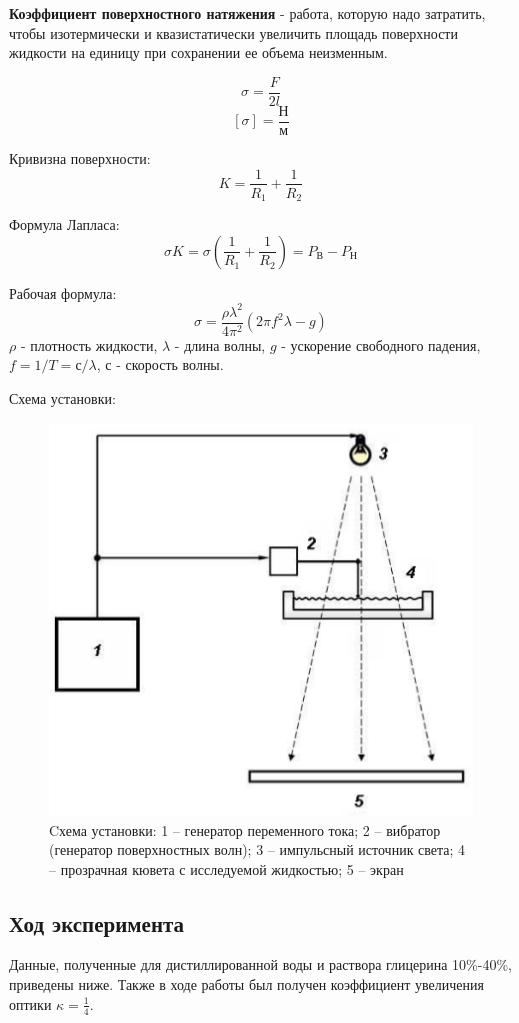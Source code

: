 \documentclass[a4paper,14pt]{article}
\begin{document}
\textbf{Коэффициент поверхностного натяжения} - работа, которую надо затратить, чтобы изотермически и  квазистатически увеличить площадь поверхности жидкости
на единицу при сохранении ее объема неизменным.

$$
\sigma= \frac{F}{2l}
$$
$$
[\sigma] = \frac{Н}{м}
$$

Кривизна поверхности:
$$
K = \frac{1}{R_1} + \frac{1}{R_2}
$$

Формула Лапласа:
$$
\sigma K = \sigma \left(\frac{1}{R_1} + \frac{1}{R_2}\right) = P_В - P_Н
$$

Рабочая формула:
$$
\sigma = \frac{\rho\lambda^2}{4\pi^2}(2\pi f^2\lambda-g)
$$
$\rho$ - плотность жидкости, $\lambda$ - длина волны, $g$ - ускорение свободного падения, $f = 1/T = с/\lambda$, $с$ - скорость волны.

Схема установки:
\begin{figure}[!ht]
    \centering
    \includegraphics[scale=0.4]{scheme.png}
    \caption{Cхема установки: 1 – генератор переменного тока; 2 – вибратор
(генератор поверхностных волн); 3 – импульсный источник света; 4 –
прозрачная кювета с исследуемой жидкостью; 5 – экран} 
\end{figure}

\clearpage

\subsection{Ход эксперимента}
\hspace{\parindent}Данные, полученные для дистиллированной воды и раствора глицерина 10\%-40\%, приведены ниже. Также в ходе работы был получен коэффициент увеличения оптики $\kappa=\frac{1}{4}$.
\end{document}
